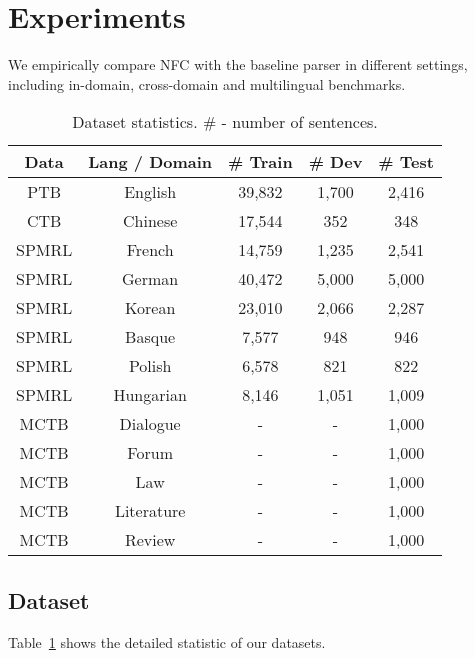 \documentclass[11pt]{article}
\begin{document}
\section{Experiments}
\label{sec:exp}

We empirically compare NFC with the baseline parser in different settings, including in-domain, cross-domain and multilingual benchmarks.





\begin{table}[t!]
\centering
\begin{adjustbox}{max width=1.0\columnwidth}
    \begin{tabular}{ccccc}
    \hline
    Data & Lang / Domain & \# Train & \# Dev & \# Test \\
    \hline
    PTB & English & 39,832 & 1,700 & 2,416 \\
    CTB & Chinese & 17,544 & 352 & 348 \\
    SPMRL & French & 14,759 & 1,235 & 2,541 \\
    SPMRL & German & 40,472 & 5,000 & 5,000 \\
    SPMRL & Korean & 23,010 & 2,066 & 2,287 \\
    SPMRL & Basque & 7,577 & 948 & 946 \\
    SPMRL & Polish & 6,578 & 821 & 822 \\
    SPMRL & Hungarian & 8,146 & 1,051 & 1,009 \\
    \hline
    MCTB & Dialogue & - & - & 1,000 \\
    MCTB & Forum & - & - & 1,000 \\
    MCTB & Law & - & - & 1,000 \\
    MCTB & Literature & - & - & 1,000 \\
    MCTB & Review & - & - & 1,000 \\
    \hline
    \end{tabular}
    \end{adjustbox}
    \caption{Dataset statistics. \# - number of sentences.}
    \label{tab:data_statistics}
\end{table}










\subsection{Dataset}
\label{sec:dataset}
Table~\ref{tab:data_statistics} shows the detailed statistic of our datasets.
\end{document}
